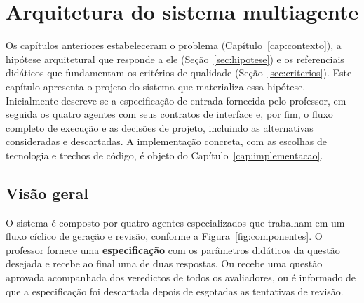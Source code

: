 \chapter{Arquitetura do sistema multiagente}
\label{cap:arquitetura}


Os capítulos anteriores estabeleceram o problema (Capítulo~\ref{cap:contexto}), a hipótese
arquitetural que responde a ele (Seção~\ref{sec:hipotese}) e os referenciais didáticos que
fundamentam os critérios de qualidade (Seção~\ref{sec:criterios}). Este capítulo apresenta o
projeto do sistema que materializa essa hipótese. Inicialmente descreve-se a especificação de
entrada fornecida pelo professor, em seguida os quatro agentes com seus contratos de interface e,
por fim, o fluxo completo de execução e as decisões de projeto, incluindo as alternativas
consideradas e descartadas. A implementação concreta, com as escolhas de tecnologia e trechos de
código, é objeto do Capítulo~\ref{cap:implementacao}.

\section{Visão geral}
\label{sec:visao-geral}

O sistema é composto por quatro agentes especializados que trabalham em um fluxo cíclico de
geração e revisão, conforme a Figura~\ref{fig:componentes}. O professor fornece uma
\textbf{especificação} com os parâmetros didáticos da questão desejada e recebe ao final uma de
duas respostas. Ou recebe uma questão aprovada acompanhada dos veredictos de todos os avaliadores,
ou é informado de que a especificação foi descartada depois de esgotadas as tentativas de revisão.

